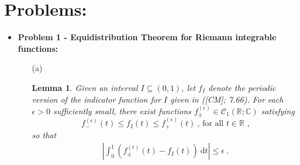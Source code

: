 \documentclass[12pt, reqno]{amsart}
\newtheorem{lemma}[theorem]{Lemma}
\theoremstyle{definition}
\theoremstyle{remark}
\newcommand{\ud}{\mathrm{d}}
\begin{document}

\section{Problems:} 

\begin{itemize}

\item {\bf{Problem 1 - Equidistribution Theorem for Riemann integrable functions:}} 


\vspace{0.1 cm}
\begin{itemize}
\item[(a)] 

\begin{lemma} \label{onea}
Given an interval $I \subseteq (0,1)$, let $f_I$ denote the periodic version of the indicator function for $I$ given in ([CM]; 7.66). For each $\epsilon > 0$ sufficiently small, there exist functions $f_\pm^{(\epsilon)} \in \mathcal{C}_1(\mathbb{R}; \mathbb{C})$ satisfying
\begin{equation}
f_{-}^{(\epsilon)}(t) \leq f_I(t) \leq f_{+}^{(\epsilon)}(t) ~\mbox{, for all $t \in \mathbb{R}$ ,}
\end{equation}
so that
\begin{align}
\left\vert \int_0^1 \left( f_{\pm}^{(\epsilon)}(t) - f_I(t) \right) ~\ud t \right\vert \leq \epsilon ~\mbox{.}\label{area_bound}
\end{align}
\end{lemma}


\end{itemize}
\end{itemize}
\end{document}
